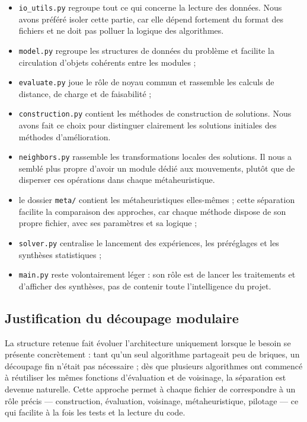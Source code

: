 \documentclass[11pt,a4paper]{article}
\begin{document}
\begin{itemize}
    \item \texttt{io\_utils.py} regroupe tout ce qui concerne la lecture des données. Nous avons préféré isoler cette partie, car elle dépend fortement du format des fichiers et ne doit pas polluer la logique des algorithmes.
    \item \texttt{model.py} regroupe les structures de données du problème et facilite la circulation d'objets cohérents entre les modules ;
    \item \texttt{evaluate.py} joue le rôle de noyau commun et rassemble les calculs de distance, de charge et de faisabilité ;
    \item \texttt{construction.py} contient les méthodes de construction de solutions. Nous avons fait ce choix pour distinguer clairement les solutions initiales des méthodes d'amélioration.
    \item \texttt{neighbors.py} rassemble les transformations locales des solutions. Il nous a semblé plus propre d'avoir un module dédié aux mouvements, plutôt que de disperser ces opérations dans chaque métaheuristique.
    \item le dossier \texttt{meta/} contient les métaheuristiques elles-mêmes ; cette séparation facilite la comparaison des approches, car chaque méthode dispose de son propre fichier, avec ses paramètres et sa logique ;
    \item \texttt{solver.py} centralise le lancement des expériences, les préréglages et les synthèses statistiques ;
    \item \texttt{main.py} reste volontairement léger : son rôle est de lancer les traitements et d'afficher des synthèses, pas de contenir toute l'intelligence du projet.
\end{itemize}

\subsection{Justification du découpage modulaire}
La structure retenue fait évoluer l'architecture uniquement lorsque le besoin se présente concrètement : tant qu'un seul algorithme partageait peu de briques, un découpage fin n'était pas nécessaire ; dès que plusieurs algorithmes ont commencé à réutiliser les mêmes fonctions d'évaluation et de voisinage, la séparation est devenue naturelle. Cette approche permet à chaque fichier de correspondre à un rôle précis — construction, évaluation, voisinage, métaheuristique, pilotage — ce qui facilite à la fois les tests et la lecture du code.
\end{document}
